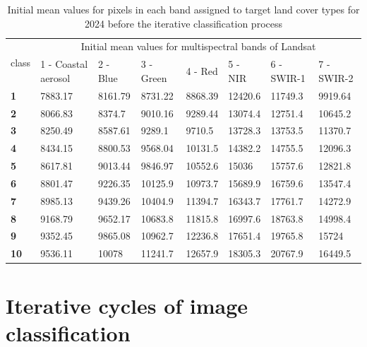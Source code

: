 \documentclass[jmse,article,submit,pdftex,moreauthors]{Definitions/mdpi}
\begin{document}
\begin{table}[H]
  \centering
  \begin{tabularx}{\textwidth}{p{0.7cm}p{2.5cm}p{1.0cm}p{1.3cm}p{1.0cm}p{1.0cm}p{1.5cm}p{1.5cm}}
  \toprule
  \multirow{2}{*}{class} & \multicolumn{7}{c}{Initial mean values for multispectral bands of Landsat} \\
     & 1 - Coastal aerosol & 2 - Blue & 3 - Green & 4 - Red & 5 - NIR & 6 - SWIR-1 & 7 - SWIR-2 \\
    \midrule
        \textbf{1} & 7883.17 & 8161.79 & 8731.22 & 8868.39 & 12420.6 & 11749.3 & 9919.64 \\
    \textbf{2} & 8066.83 & 8374.7 & 9010.16 & 9289.44 & 13074.4 & 12751.4 & 10645.2 \\
    \textbf{3} & 8250.49 & 8587.61 & 9289.1 & 9710.5 & 13728.3 & 13753.5 & 11370.7 \\
    \textbf{4} & 8434.15 & 8800.53 & 9568.04 & 10131.5 & 14382.2 & 14755.5 & 12096.3 \\
    \textbf{5} & 8617.81 & 9013.44 & 9846.97 & 10552.6 & 15036 & 15757.6 & 12821.8 \\
    \textbf{6} & 8801.47 & 9226.35 & 10125.9 & 10973.7 & 15689.9 & 16759.6 & 13547.4 \\
    \textbf{7} & 8985.13 & 9439.26 & 10404.9 & 11394.7 & 16343.7 & 17761.7 & 14272.9 \\
    \textbf{8} & 9168.79 & 9652.17 & 10683.8 & 11815.8 & 16997.6 & 18763.8 & 14998.4 \\
    \textbf{9} & 9352.45 & 9865.08 & 10962.7 & 12236.8 & 17651.4 & 19765.8 & 15724 \\
    \textbf{10} & 9536.11 & 10078 & 11241.7 & 12657.9 & 18305.3 & 20767.9 & 16449.5 \\
\bottomrule
\end{tabularx}
  \caption{Initial mean values for pixels in each band assigned to target land cover types for 2024 before the iterative classification process}
  \label{tabA4} 
\end{table} 

\section[\appendixname~\thesection]{Iterative cycles of image classification}\label{AppB}
\end{document}

